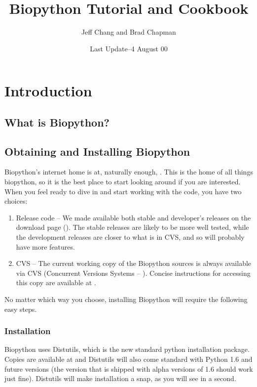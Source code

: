 \documentclass[dvips]{article}
\begin{document}
\title{Biopython
Tutorial and Cookbook}
\author{Jeff Chang and Brad Chapman}
\date{Last Update--4 August 00}

\section{Introduction}

\subsection{What is Biopython?}

\subsection{Obtaining and Installing Biopython}

Biopython's internet home is at, naturally enough,  . This is the home of all things biopython, so it is the best place to start looking around if you are interested. When you feel ready to dive in and start working with the code, you have two choices:

\begin{enumerate}

\item Release code -- We made available both stable and developer's releases on the download page (). The stable releases are likely to be more well tested, while the development releases are closer to what is in CVS, and so will probably have more features.

\item CVS -- The current working copy of the Biopython sources is always available via CVS (Concurrent Versions Systems -- ). Concise instructions for accessing this copy are available at .

\end{enumerate}

No matter which way you choose, installing Biopython will require the following easy steps.

\subsubsection{Installation}

Biopython uses Distutils, which is the new standard python installation package. Copies are available at  and Distutils will also come standard with Python 1.6 and future versions (the version that is shipped with alpha versions of 1.6 should work just fine). Distutils will make installation a snap, as you will see in a second.
\end{document}
